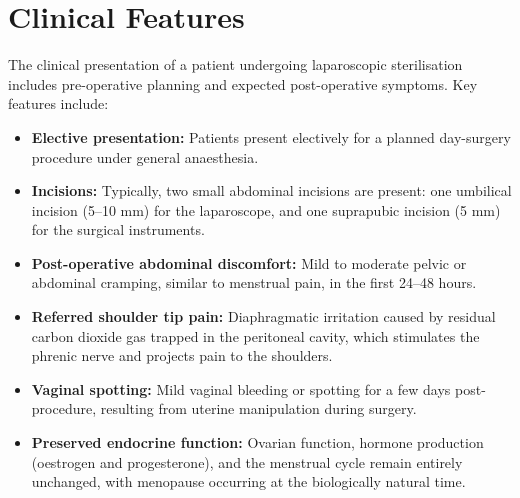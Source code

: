 \section*{Clinical Features}
The clinical presentation of a patient undergoing laparoscopic sterilisation includes pre-operative planning and expected post-operative symptoms. Key features include:
\begin{itemize}
    \item \textbf{Elective presentation:} Patients present electively for a planned day-surgery procedure under general anaesthesia.
    \item \textbf{Incisions:} Typically, two small abdominal incisions are present: one umbilical incision (5--10 mm) for the laparoscope, and one suprapubic incision (5 mm) for the surgical instruments.
    \item \textbf{Post-operative abdominal discomfort:} Mild to moderate pelvic or abdominal cramping, similar to menstrual pain, in the first 24--48 hours.
    \item \textbf{Referred shoulder tip pain:} Diaphragmatic irritation caused by residual carbon dioxide gas trapped in the peritoneal cavity, which stimulates the phrenic nerve and projects pain to the shoulders.
    \item \textbf{Vaginal spotting:} Mild vaginal bleeding or spotting for a few days post-procedure, resulting from uterine manipulation during surgery.
    \item \textbf{Preserved endocrine function:} Ovarian function, hormone production (oestrogen and progesterone), and the menstrual cycle remain entirely unchanged, with menopause occurring at the biologically natural time.
\end{itemize}

